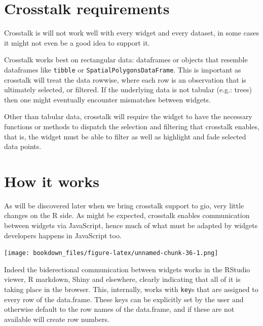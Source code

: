 \documentclass[
]{krantz}
\makeatletter
\newenvironment{Shaded}{\begin{snugshade}}{\end{snugshade}}
\newcommand{\CommentTok}[1]{\textcolor[rgb]{0.37,0.37,0.37}{\textit{#1}}}
\newcommand{\DataTypeTok}[1]{\textcolor[rgb]{0.27,0.27,0.27}{#1}}
\newcommand{\DecValTok}[1]{\textcolor[rgb]{0.06,0.06,0.06}{#1}}
\newcommand{\KeywordTok}[1]{\textcolor[rgb]{0.27,0.27,0.27}{\textbf{#1}}}
\newcommand{\NormalTok}[1]{#1}
\newcommand{\OperatorTok}[1]{\textcolor[rgb]{0.43,0.43,0.43}{\textbf{#1}}}
\newcommand{\StringTok}[1]{\textcolor[rgb]{0.5,0.5,0.5}{#1}}
\newenvironment{kframe}{%
\medskip{}
\setlength{\fboxsep}{.8em}
 \def\at@end@of@kframe{}%
 \ifinner\ifhmode%
  \def\at@end@of@kframe{\end{minipage}}%
  \begin{minipage}{\columnwidth}%
 \fi\fi%
 \def\FrameCommand##1{\hskip\@totalleftmargin \hskip-\fboxsep
 \colorbox{shadecolor}{##1}\hskip-\fboxsep
     \hskip-\linewidth \hskip-\@totalleftmargin \hskip\columnwidth}%
 \MakeFramed {\advance\hsize-\width
   \@totalleftmargin\z@ \linewidth\hsize
   \@setminipage}}%
 {\par\unskip\endMakeFramed%
 \at@end@of@kframe}
\renewenvironment{Shaded}{\begin{kframe}}{\end{kframe}}
\makeatother
\begin{document}
\hypertarget{crosstalk-requirements}{%
\section{Crosstalk requirements}\label{crosstalk-requirements}}

Crosstalk is will not work well with every widget and every dataset, in some cases it might not even be a good idea to support it.

Crosstalk works best on rectangular data: dataframes or objects that resemble dataframes like \texttt{tibble} or \texttt{SpatialPolygonsDataFrame}. This is important as crosstalk will treat the data rowwise, where each row is an observation that is ultimately selected, or filtered. If the underlying data is not tabular (e.g.: trees) then one might eventually encounter mismatches between widgets.

Other than tabular data, crosstalk will require the widget to have the necessary functions or methods to dispatch the selection and filtering that crosstalk enables, that is, the widget must be able to filter as well as highlight and fade selected data points.

\hypertarget{how-it-works}{%
\section{How it works}\label{how-it-works}}

As will be discovered later when we bring crosstalk support to gio, very little changes on the R side. As might be expected, crosstalk enables communication between widgets via JavaScript, hence much of what must be adapted by widgets developers happens in JavaScript too.

\texttt{[image: bookdown\_files/figure-latex/unnamed-chunk-36-1.png]}

Indeed the biderectional communication between widgets works in the RStudio viewer, R markdown, Shiny and elsewhere, clearly indicating that all of it is taking place in the browser. This, internally, works with \texttt{key}s that are assigned to every row of the data.frame. These keys can be explicitly set by the user and otherwise default to the row names of the data.frame, and if these are not available will create row numbers.

\begin{Shaded}
\end{Shaded}
\end{document}
